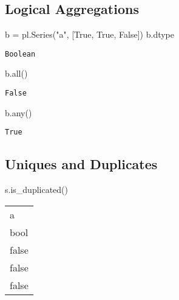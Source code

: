 \documentclass[
  letterpaper,
  DIV=11,
  numbers=noendperiod]{scrartcl}
\newenvironment{Shaded}{\begin{snugshade}}{\end{snugshade}}
\newcommand{\BuiltInTok}[1]{\textcolor[rgb]{0.00,0.23,0.31}{#1}}
\newcommand{\NormalTok}[1]{\textcolor[rgb]{0.00,0.23,0.31}{#1}}
\newcommand{\OperatorTok}[1]{\textcolor[rgb]{0.37,0.37,0.37}{#1}}
\newcommand{\StringTok}[1]{\textcolor[rgb]{0.13,0.47,0.30}{#1}}
\newcommand{\VariableTok}[1]{\textcolor[rgb]{0.07,0.07,0.07}{#1}}
\begin{document}
\hypertarget{logical-aggregations}{%
\subsection{Logical Aggregations}\label{logical-aggregations}}

\begin{Shaded}
\begin{Highlighting}[]
\NormalTok{b }\OperatorTok{=}\NormalTok{ pl.Series(}\StringTok{"a"}\NormalTok{, [}\VariableTok{True}\NormalTok{, }\VariableTok{True}\NormalTok{, }\VariableTok{False}\NormalTok{])}
\NormalTok{b.dtype}
\end{Highlighting}
\end{Shaded}

\begin{verbatim}
Boolean
\end{verbatim}

\begin{Shaded}
\begin{Highlighting}[]
\NormalTok{b.}\BuiltInTok{all}\NormalTok{()}
\end{Highlighting}
\end{Shaded}

\begin{verbatim}
False
\end{verbatim}

\begin{Shaded}
\begin{Highlighting}[]
\NormalTok{b.}\BuiltInTok{any}\NormalTok{()}
\end{Highlighting}
\end{Shaded}

\begin{verbatim}
True
\end{verbatim}

\hypertarget{uniques-and-duplicates}{%
\subsection{Uniques and Duplicates}\label{uniques-and-duplicates}}

\begin{Shaded}
\begin{Highlighting}[]
\NormalTok{s.is\_duplicated()}
\end{Highlighting}
\end{Shaded}

\begin{longtable}[]{@{}l@{}}
\toprule()
a \\
bool \\
\midrule()
\endhead
false \\
false \\
false \\
\bottomrule()
\end{longtable}
\end{document}
